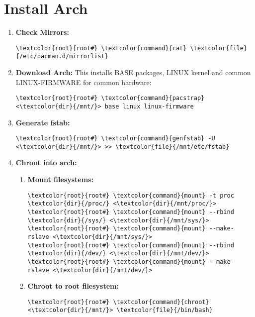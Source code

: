 \documentclass[10pt, a4paper, onecolumn, openany]{book} %
\begin{document}
\section{Install Arch}
\begin{enumerate}
    \item \textbf{Check Mirrors:}
\begin{Verbatim}[commandchars=\\\{\}]
\textcolor{root}{root#} \textcolor{command}{cat} \textcolor{file}{/etc/pacman.d/mirrorlist}
\end{Verbatim}

    \item \textbf{Download Arch:}
\newline This installs BASE packages, LINUX kernel and common LINUX-FIRMWARE for common hardware:
\begin{Verbatim}[commandchars=\\\{\}]
\textcolor{root}{root#} \textcolor{command}{pacstrap} <\textcolor{dir}{/mnt/}> base linux linux-firmware
\end{Verbatim}

    \item \textbf{Generate fstab:}
\begin{Verbatim}[commandchars=\\\{\}]
\textcolor{root}{root#} \textcolor{command}{genfstab} -U <\textcolor{dir}{/mnt/}> >> \textcolor{file}{/mnt/etc/fstab}
\end{Verbatim}

    \item \textbf{Chroot into arch:}
    \begin{enumerate}
        \item \textbf{Mount filesystems:}
\begin{Verbatim}[commandchars=\\\{\}]
\textcolor{root}{root#} \textcolor{command}{mount} -t proc \textcolor{dir}{/proc/} <\textcolor{dir}{/mnt/proc/}>
\textcolor{root}{root#} \textcolor{command}{mount} --rbind \textcolor{dir}{/sys/} <\textcolor{dir}{/mnt/sys/}>
\textcolor{root}{root#} \textcolor{command}{mount} --make-rslave <\textcolor{dir}{/mnt/sys/}>
\textcolor{root}{root#} \textcolor{command}{mount} --rbind \textcolor{dir}{/dev/} <\textcolor{dir}{/mnt/dev/}>
\textcolor{root}{root#} \textcolor{command}{mount} --make-rslave <\textcolor{dir}{/mnt/dev/}>
\end{Verbatim}
        \item \textbf{Chroot to root filesystem:}
\begin{Verbatim}[commandchars=\\\{\}]
\textcolor{root}{root#} \textcolor{command}{chroot} <\textcolor{dir}{/mnt/}> \textcolor{file}{/bin/bash}
\end{Verbatim}
    \end{enumerate}



\end{enumerate}
\end{document}

